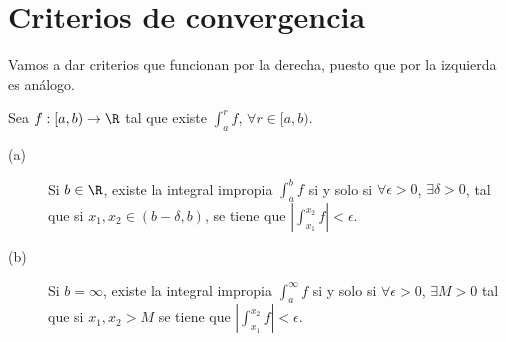 \section{Criterios de convergencia}
Vamos a dar criterios que funcionan por la derecha, puesto que por la izquierda es análogo.
\begin{ftheorem}
\normalfont Sea $\displaystyle f : [a,b) \to \R $ tal que existe $\displaystyle \int^{r}_{a} f $, $\displaystyle \forall r \in [a,b) $. 
\begin{description}
\item[(a)] Si $\displaystyle b \in \R $, existe la integral impropia $\displaystyle \int^{b}_{a} f  $ si y solo si $\displaystyle \forall \epsilon > 0 $, $\displaystyle \exists \delta > 0 $, tal que si $\displaystyle x_{1}, x_{2} \in \left(b-\delta, b\right) $, se tiene que $\displaystyle \left|\int^{x_{2}}_{x_{1}} f \right|< \epsilon  $.
\item[(b)] Si $\displaystyle b = \infty $, existe la integral impropia $\displaystyle \int^{\infty}_{a} f $ si y solo si $\displaystyle \forall \epsilon > 0 $, $\displaystyle \exists M > 0 $ tal que si $\displaystyle x_{1}, x_{2} > M $ se tiene que $\displaystyle \left|\int^{x_{2}}_{x_{1}} f \right|<\epsilon  $.
\end{description}
\end{ftheorem}
